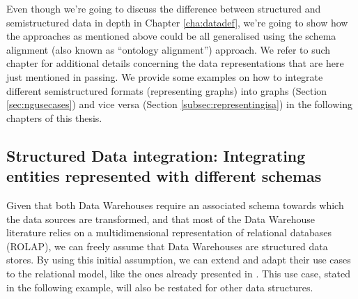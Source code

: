 Even though we’re going to discuss the difference between structured and semistructured data in depth in Chapter \ref{cha:datadef}, we’re going to show how the approaches as mentioned above could be all generalised using the schema alignment (also known as ``ontology alignment'') approach. We refer to such chapter for additional details concerning the data representations that are here just mentioned in passing. We provide some examples on how to integrate different semistructured formats (representing graphs) into graphs (Section  \vref{sec:ngusecases}) and vice versa (Section \vref{subsec:representingisa}) in the following chapters of this thesis.








\subsection{Structured Data integration: Integrating entities represented with different schemas}\label{subsec:treunouno}
Given that both Data Warehouses require an associated schema towards which the data sources are transformed, and that most of the Data Warehouse literature relies on a multidimensional representation of relational databases (ROLAP), we can freely assume that Data Warehouses are structured data stores. By using this initial assumption, we can extend and adapt their use cases to the relational model, like the ones already presented in \cite{GolfarelliMPRT12}. This use case, stated in the following example, will also be restated for other data structures.


